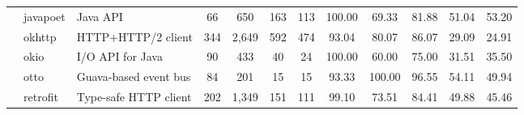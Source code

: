 \begin{landscape}
\begin{table}
\begin{tabular}{lllccccccccc}
                            & javapoet                                                      & Java API                                                                 & 66              & 650              & 163                                                              & 113            & 100.00         & 69.33          & 81.88          & 51.04                                                             & 53.20                                                              \\
                            & okhttp                                                        & HTTP+HTTP/2 client                                                       & 344             & 2,649            & 592                                                              & 474            & 93.04          & 80.07          & 86.07          & 29.09                                                             & 24.91                                                              \\
                            & okio                                                          & I/O API for Java                                                         & 90              & 433              & 40                                                               & 24             & 100.00         & 60.00          & 75.00          & 31.51                                                             & 35.50                                                              \\
                            & otto                                                          & Guava-based event bus                                                    & 84              & 201              & 15                                                               & 15             & 93.33          & 100.00         & 96.55          & 54.11                                                             & 49.94                                                              \\
                            & retrofit                                                      & Type-safe HTTP client                                                    & 202             & 1,349            & 151                                                              & 111            & 99.10          & 73.51          & 84.41          & 49.88                                                             & 45.46                                                              \\ \hline

\end{tabular}
\end{table}
\end{landscape}
